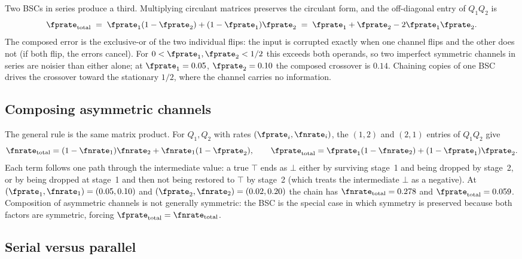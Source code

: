 Two BSCs in series produce a third. Multiplying circulant matrices preserves
the circulant form, and the off-diagonal entry of $Q_1 Q_2$ is
\begin{equation}
\label{eq:bsc-composition}
  \fprate_{\mathrm{total}}
  \;=\; \fprate_1(1 - \fprate_2) + (1 - \fprate_1)\fprate_2
  \;=\; \fprate_1 + \fprate_2 - 2\fprate_1\fprate_2.
\end{equation}
The composed error is the exclusive-or of the two individual flips: the input is
corrupted exactly when one channel flips and the other does not (if both flip,
the errors cancel). For $0 < \fprate_1, \fprate_2 < 1/2$ this exceeds both
operands, so two imperfect symmetric channels in series are noisier than either
alone; at $\fprate_1 = 0.05$, $\fprate_2 = 0.10$ the composed crossover is
$0.14$. Chaining copies of one BSC drives the crossover toward the stationary
$1/2$, where the channel carries no information.

\subsection*{Composing asymmetric channels}

The general rule is the same matrix product. For $Q_1, Q_2$ with rates
$(\fprate_i, \fnrate_i)$, the $(1,2)$ and $(2,1)$ entries of $Q_1 Q_2$ give
\begin{equation}
\label{eq:asym-composition}
  \fnrate_{\mathrm{total}} = (1 - \fnrate_1)\fnrate_2 + \fnrate_1 (1 - \fprate_2),
  \qquad
  \fprate_{\mathrm{total}} = \fprate_1 (1 - \fnrate_2) + (1 - \fprate_1)\fprate_2 .
\end{equation}
Each term follows one path through the intermediate value: a true $\top$ ends
as $\bot$ either by surviving stage~1 and being dropped by stage~2, or by being
dropped at stage~1 and then not being restored to $\top$ by stage~2 (which
treats the intermediate $\bot$ as a negative). At $(\fprate_1, \fnrate_1) =
(0.05, 0.10)$ and $(\fprate_2, \fnrate_2) = (0.02, 0.20)$ the chain has
$\fnrate_{\mathrm{total}} = 0.278$ and $\fprate_{\mathrm{total}} = 0.059$.
Composition of asymmetric channels is not generally symmetric: the BSC is the
special case in which symmetry is preserved because both factors are
symmetric, forcing $\fprate_{\mathrm{total}} = \fnrate_{\mathrm{total}}$.

\subsection*{Serial versus parallel}

